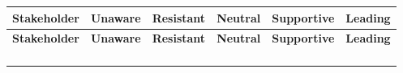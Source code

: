 \documentclass[10pt,letterpaper]{article}
\renewcommand\arraystretch{1.25}
\begin{document}
\begin{center}
\begingroup
\setlength\tabcolsep{2.0pt}
\scriptsize
\renewcommand\arraystretch{1.55}
\begin{longtable}{|>{\raggedright\arraybackslash}p{0.995in}|>{\raggedright\arraybackslash}p{0.995in}|>{\raggedright\arraybackslash}p{0.995in}|>{\raggedright\arraybackslash}p{0.995in}|>{\raggedright\arraybackslash}p{0.995in}|>{\raggedright\arraybackslash}p{0.995in}|}
\hline
\rowcolor{light}
\textbf{Stakeholder} & \textbf{Unaware} & \textbf{Resistant} & \textbf{Neutral} & \textbf{Supportive} & \textbf{Leading} \\ \hline
\endfirsthead
\hline\rowcolor{light} \textbf{Stakeholder} & \textbf{Unaware} & \textbf{Resistant} & \textbf{Neutral} & \textbf{Supportive} & \textbf{Leading} \\ \hline
\endhead
\rule{0pt}{11pt}\hspace{0pt} & \rule{0pt}{11pt}\hspace{0pt} & \rule{0pt}{11pt}\hspace{0pt} & \rule{0pt}{11pt}\hspace{0pt} & \rule{0pt}{11pt}\hspace{0pt} & \rule{0pt}{11pt}\hspace{0pt} \\ \hline
\rule{0pt}{11pt}\hspace{0pt} & \rule{0pt}{11pt}\hspace{0pt} & \rule{0pt}{11pt}\hspace{0pt} & \rule{0pt}{11pt}\hspace{0pt} & \rule{0pt}{11pt}\hspace{0pt} & \rule{0pt}{11pt}\hspace{0pt} \\ \hline
\rule{0pt}{11pt}\hspace{0pt} & \rule{0pt}{11pt}\hspace{0pt} & \rule{0pt}{11pt}\hspace{0pt} & \rule{0pt}{11pt}\hspace{0pt} & \rule{0pt}{11pt}\hspace{0pt} & \rule{0pt}{11pt}\hspace{0pt} \\ \hline
\rule{0pt}{11pt}\hspace{0pt} & \rule{0pt}{11pt}\hspace{0pt} & \rule{0pt}{11pt}\hspace{0pt} & \rule{0pt}{11pt}\hspace{0pt} & \rule{0pt}{11pt}\hspace{0pt} & \rule{0pt}{11pt}\hspace{0pt} \\ \hline
\end{longtable}
\endgroup
\end{center}
\end{document}
